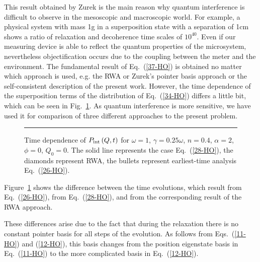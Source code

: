 \documentclass[12pt,twoside,a4paper]{report}
\begin{document}
This result obtained by Zurek \cite{2} is the main reason why quantum
interference is difficult to observe in the mesoscopic and macroscopic
world. For example, a physical system with mass 1g %
in a superposition state with a separation of 1cm %
shows a ratio of relaxation and decoherence time scales of $10^{40}$.  
Even if our measuring device is able to reflect the quantum 
properties of the microsystem, nevertheless
objectification \cite{20} occurs due to the coupling 
between the meter and the environment.
The fundamental result of Eq.~(\ref{37-HO}) is obtained no matter which
approach is used, e.g. the RWA or Zurek's pointer basis approach or
the self-consistent description of the present work. However, the
time dependence of the superposition terms of the distribution of
Eq.~(\ref{34-HO}) differs a little bit, which can be seen in Fig.~\ref{fig-HO-Pint}.  
As quantum interference is more sensitive, we have used it for
comparison of three different approaches to the present problem. 
\footnotesize\begin{figure}[ht]
    \parbox{6cm}
    {\rule{2.5cm}{0cm}\epsfxsize=13cm}
\vspace{-7cm}
\caption[Time dependence of  $P_{\rm int}$]
{\small  Time dependence of  $P_{\rm int} \left( Q,t\right)$ 
  for $\omega=1$,  $\gamma=0.25\omega$, $n=0.4$,
  $\alpha=2$, $\phi=0$, $Q_0=0$.
  The solid line represents the case Eq.~(\ref{28-HO}), 
  the diamonds represent RWA, the bullets represent 
  earliest-time analysis Eq.~(\ref{26-HO}).}
\label{fig-HO-Pint}
\end{figure}\normalsize
Figure~\ref{fig-HO-Pint} shows the difference between the time evolutions, 
which result from Eq.~(\ref{26-HO}), 
from Eq.~(\ref{28-HO}), and from the corresponding result of
the RWA approach.

These differences arise due to the fact that during the relaxation
there is no constant pointer basis for all steps of the
evolution. As follows from Eqs.~(\ref{11-HO}) and (\ref{12-HO}), this basis
changes from the position eigenstate basis in Eq.~(\ref{11-HO}) to
the more complicated basis in Eq.~(\ref{12-HO}).
\end{document}
